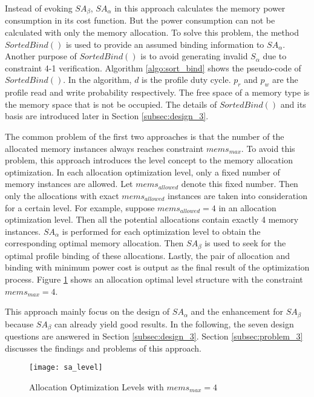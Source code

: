 	Instead of evoking $SA_{\beta}$, $SA_{\alpha}$ in this approach calculates
	the memory power consumption in its cost function.
	But the power consumption can not be calculated with only the memory
	allocation.
	To solve this problem, the method $SortedBind()$ is used to
	provide an assumed binding information to $SA_{\alpha}$.
	Another purpose of $SortedBind()$ is to avoid generating invalid $S_{\alpha}$
	due to constraint 4-1 verification.
	Algorithm \ref{algo:sort_bind} shows the pseudo-code of $SortedBind()$.
	In the algorithm, $d$ is the profile duty cycle.
	$p_{r}$ and $p_{w}$ are the profile read and write probability respectively.
	The free space of a memory type is the memory space that is not be occupied.
	The details of $SortedBind()$ and its basis are introduced later in Section
	\ref{subsec:design_3}.
	
	
	The common problem of the first two approaches
	is that the number of the allocated memory instances always reaches constraint
	$mems_{max}$.
	To avoid this problem, this approach introduces the level concept to the memory
	allocation optimization. In each allocation optimization level, only a fixed
	number of memory instances are allowed. Let $mems_{allowed}$ denote this fixed
	number. Then only the allocations with exact $mems_{allowed}$ instances are
	taken into consideration for a certain level.
	For example, suppose $mems_{allowed}=4$ in an allocation optimization level.
	Then all the potential allocations contain exactly 4 memory instances.
	$SA_{\alpha}$ is performed for each optimization level to obtain the corresponding
	optimal memory allocation. Then $SA_{\beta}$ is used to seek for the optimal
	profile binding of these allocations. Lastly, the pair of allocation and binding
	with minimum power cost is output as the final result of the optimization process.
	Figure \ref{fig:sa_level} shows an allocation optimal level structure with the
	constraint $mems_{max}=4$.
	
	This approach mainly focus on the design of $SA_{\alpha}$ and the enhancement
	for $SA_{\beta}$ because $SA_{\beta}$ can already yield good results.
	In the following, the seven design questions are answered in Section
	\ref{subsec:design_3}. Section \ref{subsec:problem_3} discusses the findings
	and problems of this approach.
	\begin{figure}[h]
		\begin{center}
			\texttt{[image: sa\_level]}
			\caption{Allocation Optimization Levels with $mems_{max}=4$}
			\label{fig:sa_level}
		\end{center}
	\end{figure}

